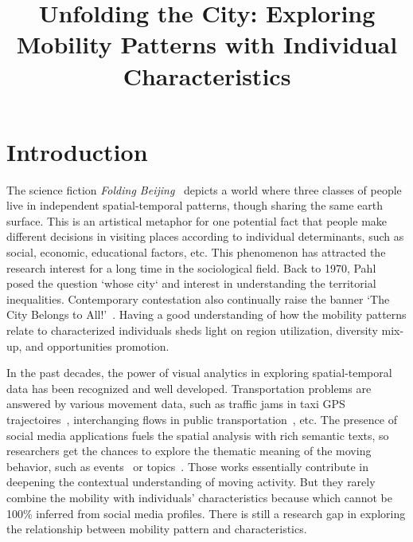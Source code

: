\documentclass{vgtc}                          %
\title{Unfolding the City: Exploring Mobility Patterns with Individual Characteristics}
\begin{document}



\maketitle

\section{Introduction}
The science fiction \textit{Folding Beijing}~\cite{hao2016_foldingbeijing} depicts a world where three classes of people live in independent spatial-temporal patterns, though sharing the same earth surface. This is an artistical metaphor for one potential fact that people make different decisions in visiting places according to individual determinants, such as social, economic, educational factors, etc. This phenomenon has attracted the research interest for a long time in the sociological field. Back to 1970, Pahl~\cite{pahl1975whose} posed the question `whose city` and interest in understanding the territorial inequalities. Contemporary contestation also continually raise the banner `The City Belongs to All!'~\cite{Mayer2017_whosecity}. Having a good understanding of how the mobility patterns relate to characterized individuals sheds light on region utilization, diversity mix-up, and opportunities promotion. 

In the past decades, the power of visual analytics in exploring spatial-temporal data has been recognized and well developed. Transportation problems are answered by various movement data, such as traffic jams in taxi GPS trajectoires~\cite{wang2013visual}, interchanging flows in public transportation~\cite{zeng2013visualizing}, etc. The presence of social media applications fuels the spatial analysis with rich semantic texts, so researchers get the chances to explore the thematic meaning of the moving behavior, such as events~\cite{chen2017map} or topics~\cite{bosch2013scatterblogs2}. Those works essentially contribute in deepening the contextual understanding of moving activity. But they rarely combine the mobility with individuals' characteristics because which cannot be 100\% inferred from social media profiles. There is still a research gap in exploring the relationship between mobility pattern and characteristics. 
\end{document}
